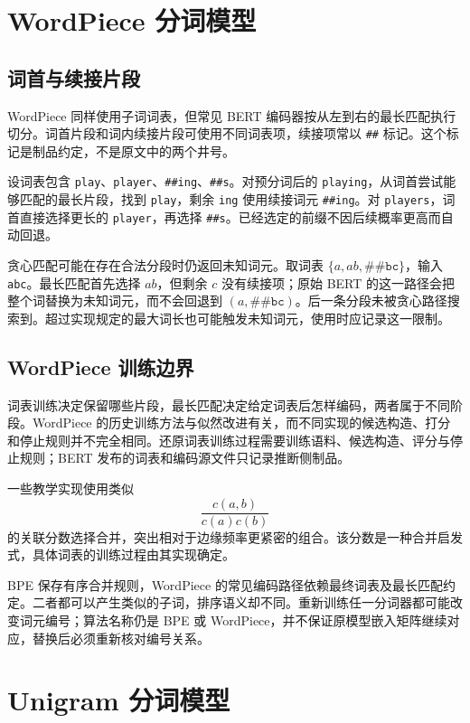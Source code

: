 \documentclass[../textbook.tex]{subfiles}
\begin{document}
\section{WordPiece 分词模型}
\optional
\subsection{词首与续接片段}
WordPiece 同样使用子词词表，但常见 BERT 编码器按从左到右的最长匹配执行切分\cite{googleBertTokenization2018}。词首片段和词内续接片段可使用不同词表项，续接项常以 \texttt{\#\#} 标记。这个标记是制品约定，不是原文中的两个井号。

设词表包含 \texttt{play}、\texttt{player}、\texttt{\#\#ing}、\texttt{\#\#s}。对预分词后的 \texttt{playing}，从词首尝试能够匹配的最长片段，找到 \texttt{play}，剩余 \texttt{ing} 使用续接词元 \texttt{\#\#ing}。对 \texttt{players}，词首直接选择更长的 \texttt{player}，再选择 \texttt{\#\#s}。已经选定的前缀不因后续概率更高而自动回退。

贪心匹配可能在存在合法分段时仍返回未知词元。取词表 $\{a,ab,\texttt{\#\#bc}\}$，输入 \texttt{abc}。最长匹配首先选择 $ab$，但剩余 $c$ 没有续接项；原始 BERT 的这一路径会把整个词替换为未知词元，而不会回退到 $(a,\texttt{\#\#bc})$。后一条分段未被贪心路径搜索到。超过实现规定的最大词长也可能触发未知词元，使用时应记录这一限制。

\subsection{WordPiece 训练边界}
词表训练决定保留哪些片段，最长匹配决定给定词表后怎样编码，两者属于不同阶段。WordPiece 的历史训练方法与似然改进有关，而不同实现的候选构造、打分和停止规则并不完全相同。还原词表训练过程需要训练语料、候选构造、评分与停止规则；BERT 发布的词表和编码源文件只记录推断侧制品。

一些教学实现使用类似
\begin{equation}
 \frac{c(a,b)}{c(a)c(b)}
\end{equation}
的关联分数选择合并，突出相对于边缘频率更紧密的组合。该分数是一种合并启发式，具体词表的训练过程由其实现确定。

BPE 保存有序合并规则，WordPiece 的常见编码路径依赖最终词表及最长匹配约定。二者都可以产生类似的子词，排序语义却不同。重新训练任一分词器都可能改变词元编号；算法名称仍是 BPE 或 WordPiece，并不保证原模型嵌入矩阵继续对应，替换后必须重新核对编号关系。

\section{Unigram 分词模型}
\optional
\end{document}

